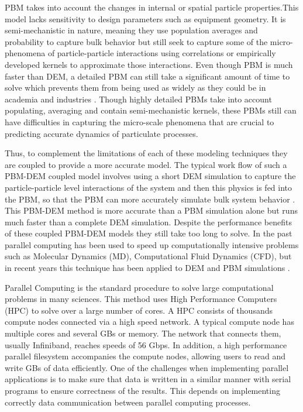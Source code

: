 \documentclass[preprint,11pt,authoryear]{elsarticle}
\begin{document}
PBM takes into account the changes in internal or spatial particle properties.This 
model lacks sensitivity to design parameters such as equipment geometry. It is semi-mechanistic in 
nature, meaning they use population averages and probability to capture bulk behavior but still 
seek to capture some of the micro-phenomena of particle-particle interactions using correlations or 
empirically developed kernels to approximate those interactions. Even though PBM is much faster 
than DEM, a detailed PBM can still take a significant amount of time to solve which prevents them 
from being used as widely as they could be in academia and industries \citep{Barrasso2013}. Though highly 
detailed PBMs take into account populating, averaging and contain semi-mechanistic kernels, these 
PBMs still can have difficulties in capturing the micro-scale phenomena that are crucial to 
predicting accurate dynamics of particulate processes. 

Thus, to complement the limitations of each of these modeling techniques they are coupled to 
provide a more accurate model.  The typical work flow of such a PBM-DEM coupled model involves 
using a short DEM simulation to capture the particle-particle level interactions of the system and 
then this physics is fed into the PBM, so that the PBM can more accurately simulate bulk system 
behavior \citep{Goldschmidt2003} \citep{Reinhold2012}\citep{Barrasso2013}. This PBM-DEM 
method is more accurate than a PBM simulation alone but runs much faster than a complete DEM 
simulation. Despite the performance benefits of these coupled PBM-DEM models they still take too 
long to solve. In the past parallel computing has been used to speed up computationally intensive 
problems such as Molecular Dynamics (MD), Computational Fluid Dynamics (CFD), but in recent 
years  this technique has been applied to DEM and PBM simulations 
\citep{Bettencourt2017}\citep{Prakash2013a}\citep{Gunawan2008}.


Parallel Computing is the standard procedure to solve large computational problems in many sciences. 
This method uses High Performance Computers (HPC) to solve over a large number of cores. 
A HPC consists of thousands compute nodes connected via a high speed network. A typical compute 
node has multiple cores and several GBs or memory. The network that connects them, usually Infiniband, 
reaches speeds of 56 Gbps. In addition, a high performance parallel filesystem accompanies the compute 
nodes, allowing users to read and write GBs of data efficiently. One of the challenges when implementing 
parallel applications is to make sure that data is written in a similar manner with serial programs 
to ensure correctness of the results. This depends on implementing correctly data communication 
between parallel computing processes.
\end{document}
